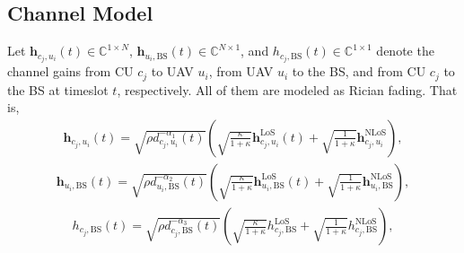 \documentclass[10pt,journal,compsoc]{IEEEtran}
\begin{document}
\subsection{Channel Model}
Let $\bm{h}_{c_{j}, u_{i}}(t) \in \mathbb{C}^{1 \times N}$, $\bm{h}_{u_{i},\text{BS}}(t) \in \mathbb{C}^{N \times 1}$, and $h_{c_{j}, \text{BS}}(t) \in \mathbb{C}^{1 \times 1}$ denote the channel gains from CU $c_{j}$ to UAV $u_{i}$, from UAV $u_{i}$ to the BS, and from CU $c_{j}$ to the BS at timeslot $t$, respectively. All of them are modeled as Rician fading\cite{Related works:ISAC:JSAC:Robust-Covert-ISAC, Related works:ISCC:TMC:Joint-Trajectory-And}. That is,
\begin{equation}
    \begin{array}{c}
    \bm{h}_{c_{j}, u_{i}}(t) = \sqrt{\rho d_{c_{j},u_{i}}^{-\alpha_{1}}(t)}\left(\sqrt{\frac{\kappa}{1 + \kappa}}\bm{h}_{c_{j}, u_{i}}^{\text{LoS}}(t) %
    + \sqrt{\frac{1}{1 +  \kappa}}\bm{h}_{c_{j}, u_{i}}^{\text{NLoS}}\right),
    \end{array}
\end{equation}
    \begin{equation}
    \begin{array}{c}
    \bm{h}_{u_{i},\text{BS}}(t) = \sqrt{\rho d_{u_{i},\text{BS}}^{-\alpha_{2}}(t)}\left(\sqrt{\frac{\kappa}{1 + \kappa}}\bm{h}_{u_{i},\text{BS}}^{\text{LoS}}(t) %
    + \sqrt{\frac{1}{1 +  \kappa}}\bm{h}_{u_{i}, \text{BS}}^{\text{NLoS}}\right),
    \end{array}
    \end{equation}
    \begin{equation}
    \begin{array}{c}
    h_{c_{j}, \text{BS}}(t) = \sqrt{\rho d_{c_{j}, \text{BS}}^{-\alpha_{3}}(t)}\left(\sqrt{\frac{\kappa}{1 + \kappa}}h_{c_{j}, \text{BS}}^{\text{LoS}} %
    + \sqrt{\frac{1}{1 +  \kappa}}h_{c_{j}, \text{BS}}^{\text{NLoS}}\right),
    \end{array}
    \end{equation}
\end{document}
